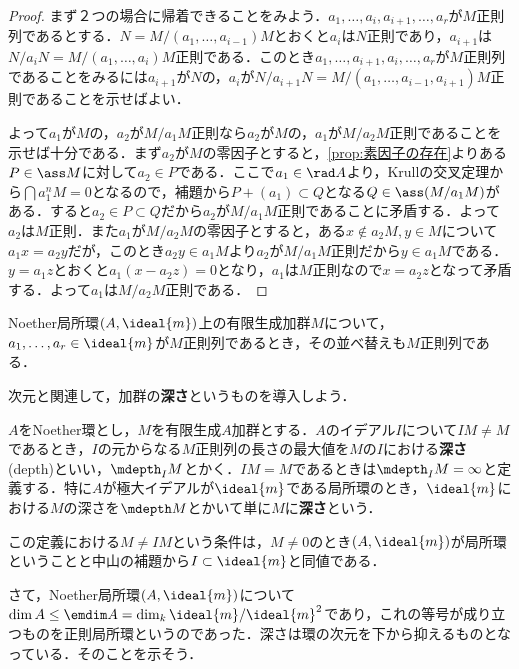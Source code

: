 \begin{proof}
	まず２つの場合に帰着できることをみよう．$a_1,\dots,a_i,a_{i+1},\dots,a_r$が$M$正則列であるとする．$N=M/(a_1,\dots,a_{i-1})M$とおくと$a_i$は$N$正則であり，$a_{i+1}$は$N/a_iN=M/(a_1,\dots,a_i)M$正則である．このとき$a_1,\dots,a_{i+1},a_i,\dots,a_r$が$M$正則列であることをみるには$a_{i+1}$が$N$の，$a_i$が$N/a_{i+1}N=M/(a_1,\dots,a_{i-1},a_{i+1})M$正則であることを示せばよい．
	
	よって$a_1$が$M$の，$a_2$が$M/a_1M$正則なら$a_2$が$M$の，$a_1$が$M/a_2M$正則であることを示せば十分である．まず$a_2$が$M$の零因子とすると，\ref{prop:素因子の存在}よりある$P\in\ass M$に対して$a_2\in P$である．ここで$a_1\in\rad A$より，Krullの交叉定理から$\bigcap a_1^nM=0$となるので，補題から$P+(a_1)\subset Q$となる$Q\in\ass (M/a_1M)$がある．すると$a_2\in P\subset Q$だから$a_2$が$M/a_1M$正則であることに矛盾する．よって$a_2$は$M$正則．また$a_1$が$M/a_2M$の零因子とすると，ある$x\not\in a_2M,y\in M$について$a_1x=a_2y$だが，このとき$a_2y\in a_1M$より$a_2$が$M/a_1M$正則だから$y\in a_1M$である．$y=a_1z$とおくと$a_1(x-a_2z)=0$となり，$a_1$は$M$正則なので$x=a_2z$となって矛盾する．よって$a_1$は$M/a_2M$正則である．
\end{proof}

\begin{cor}
	Noether局所環$(A,\ideal{m})$上の有限生成加群$M$について，$a_1,\dots,a_r\in\ideal{m}$が$M$正則列であるとき，その並べ替えも$M$正則列である．
\end{cor}

次元と関連して，加群の\textbf{深さ}というものを導入しよう．

\begin{defi}[深さ]
	$A$をNoether環とし，$M$を有限生成$A$加群とする．$A$のイデアル$I$について$IM\neq M$であるとき，$I$の元からなる$M$正則列の長さの最大値を$M$の$I$における\textbf{深さ}(depth)といい，$\mdepth_I M$とかく．$IM=M$であるときは$\mdepth_I M=\infty$と定義する．特に$A$が極大イデアルが$\ideal{m}$である局所環のとき，$\ideal{m}$における$M$の深さを$\mdepth M$とかいて単に$M$に\textbf{深さ}という．
\end{defi}

この定義における$M\neq IM$という条件は，$M\neq0$のとき$(A,\ideal{m})$が局所環ということと中山の補題から$I\subset\ideal{m}$と同値である．

さて，Noether局所環$(A,\ideal{m})$について$\dim A\leq \emdim A=\dim_k\ideal{m}/\ideal{m}^2$であり，これの等号が成り立つものを正則局所環というのであった．深さは環の次元を下から抑えるものとなっている．そのことを示そう．

